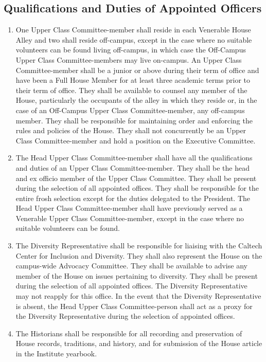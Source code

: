 \documentclass[10pt]{article} %
\begin{document}
\subsection{Qualifications and Duties of Appointed Officers}
\label{AppointedDuties}
\begin{enumerate}
\item One Upper Class Committee-member shall reside in each Venerable House Alley and two shall reside off-campus, except in the case where no suitable volunteers can be found living off-campus, in which case the Off-Campus Upper Class Committee-members may live on-campus. An Upper Class Committee-member shall be a junior or above during their term of office and have been a Full House Member for at least three academic terms prior to their term of office. They shall be available to counsel any member of the House, particularly the occupants of the alley in which they reside or, in the case of an Off-Campus Upper Class Committee-member, any off-campus member. They shall be responsible for maintaining order and enforcing the rules and policies of the House. They shall not concurrently be an Upper Class Committee-member and hold a position on the Executive Committee.
\item The Head Upper Class Committee-member shall have all the qualifications and duties of an Upper Class Committee-member. They shall be the head and ex officio member of the Upper Class Committee. They shall be present during the selection of all appointed offices. They shall be responsible for the entire frosh selection except for the duties delegated to the President. The Head Upper Class Committee-member shall have previously served as a Venerable Upper Class Committee-member, except in the case where no suitable volunteers can be found.
\item The Diversity Representative shall be responsible for liaising with the Caltech Center for Inclusion and Diversity. They shall also represent the House on the campus-wide Advocacy Committee. They shall be available to advise any member of the House on issues pertaining to diversity. They shall be present during the selection of all appointed offices. The Diversity Representative may not reapply for this office. In the event that the Diversity Representative is absent, the Head Upper Class Committee-person shall act as a proxy for the Diversity Representative during the selection of appointed offices.
\item The Historians shall be responsible for all recording and preservation of House records, traditions, and history, and for submission of the House article in the Institute yearbook.

\end{enumerate}
\end{document}
